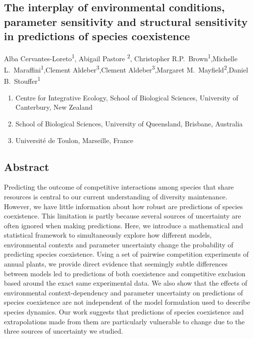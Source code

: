 \begin{refsection}
\chapter{The interplay of environmental conditions, parameter sensitivity and structural sensitivity in predictions of species coexistence} %
\label{Bayesian_competition}

\noindent Alba Cervantes-Loreto\textsuperscript{1}, Abigail Pastore \textsuperscript{2}, Christopher R.P.\ Brown\textsuperscript{1},Michelle L.\ Maraffini\textsuperscript{1},Clement Aldeber\textsuperscript{3},Clement Aldeber\textsuperscript{3},Margaret M.\ Mayfield\textsuperscript{2},Daniel B.\ Stouffer\textsuperscript{1}

\begin{enumerate}
    \item Centre for Integrative Ecology, School of Biological Sciences, University of Canterbury, New Zealand
    \item School of Biological Sciences, University of Queensland, Brisbane, Australia
    \item Université de Toulon,  Marseille, France
\end{enumerate}

\section*{Abstract}


Predicting the outcome of competitive interactions among species that share resources is central to our current understanding of diversity maintenance. However, we have little information about how robust are predictions of species coexistence. This limitation is partly because several sources of uncertainty are often ignored when making predictions. Here, we introduce a mathematical and statistical framework to simultaneously explore how different models, environmental contexts and parameter uncertainty change the probability of predicting species coexistence.  Using a set of pairwise competition experiments of annual plants, we provide direct evidence that seemingly subtle differences between models led to predictions of both coexistence and competitive exclusion based around the exact same experimental data. We also show that the effects of environmental context-dependency and parameter uncertainty on predictions of species coexistence are not independent of the model formulation used to describe species dynamics. Our work suggests that predictions of species coexistence and extrapolations made from them are particularly vulnerable to change due to the three sources of uncertainty we studied.


\end{refsection}
